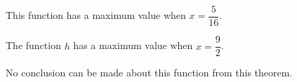 
\begin{list}{\bf{\ref{exer:sec11-6}.}}
\item \begin{list}{\bf{(a)}}
\item This function has a maximum value when $x = \dfrac{5}{16}$.
\end{list}
\end{list}

\begin{list}{}
\item \begin{list}{\bf{(b)}}
\item The function $h$ has a maximum value when $x = \dfrac{9}{2}$.
\end{list}
\end{list}


\begin{list}{}
\item \begin{list}{\bf{(c)}}
\item No conclusion can be made about this function from this theorem.
\end{list}
\end{list}




